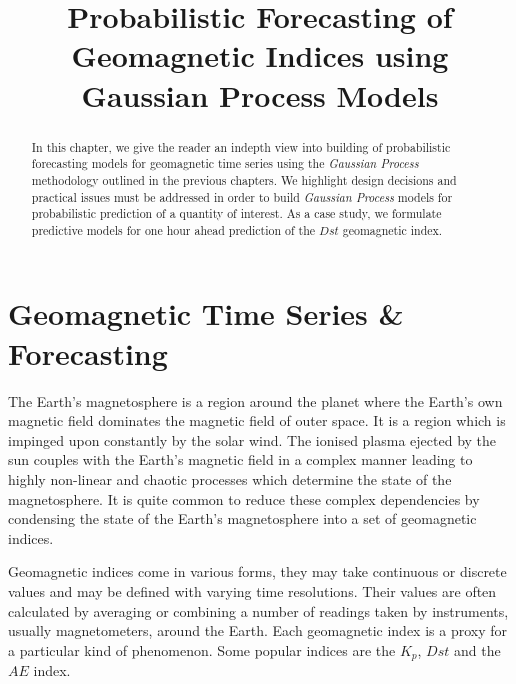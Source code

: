 \documentclass{article}
\title{Probabilistic Forecasting of Geomagnetic Indices using Gaussian Process Models}
\begin{document}
\begin{abstract}

In this chapter, we give the reader an indepth view into building of probabilistic forecasting models for geomagnetic time series using the \emph{Gaussian Process} methodology outlined in the previous chapters. We highlight design decisions and practical issues must be addressed in order to build \emph{Gaussian Process} models for probabilistic prediction of a quantity of interest. As a case study, we formulate predictive models for one hour ahead prediction of the $Dst$ geomagnetic index.  

\end{abstract}

\section{Geomagnetic Time Series \& Forecasting}

The Earth's magnetosphere is a region around the planet where the Earth's own magnetic field dominates the magnetic field of outer space. It is a region which is impinged upon constantly by the solar wind. The ionised plasma ejected by the sun couples with the Earth's magnetic field in a complex manner leading to highly non-linear and chaotic processes which determine the state of the magnetosphere. It is quite common to reduce these complex dependencies by condensing the state of the Earth's magnetosphere into a set of geomagnetic indices.

Geomagnetic indices come in various forms, they may take continuous or discrete values and may be defined with varying time resolutions. Their values are often calculated by averaging or combining a number of readings taken by instruments, usually magnetometers, around the Earth. Each geomagnetic index is a proxy for a particular kind of phenomenon. Some popular indices are the $K_p$, $Dst$ and the $AE$ index.
\end{document}
